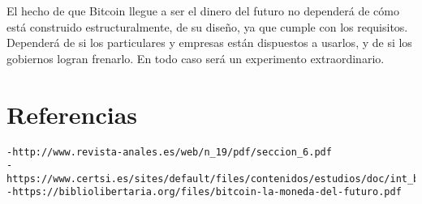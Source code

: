 \documentclass[12pt,letterpaper]{article}
\begin{document}
El hecho de que Bitcoin llegue a ser el dinero del futuro no dependerá de cómo está construido estructuralmente, de su diseño, ya que cumple con los requisitos.
Dependerá de si los particulares y empresas están dispuestos a usarlos, y de si los gobiernos logran frenarlo. En todo caso será un experimento extraordinario.

\section*{Referencias}
\begin{verbatim}
-http://www.revista-anales.es/web/n_19/pdf/seccion_6.pdf
-https://www.certsi.es/sites/default/files/contenidos/estudios/doc/int_bitcoin.pdf
-https://bibliolibertaria.org/files/bitcoin-la-moneda-del-futuro.pdf
\end{verbatim}	
\end{document}
